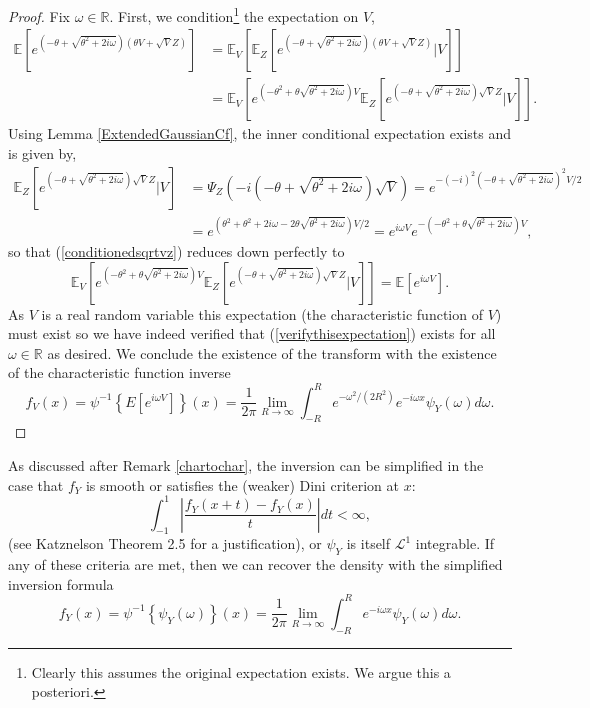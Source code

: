 \documentclass{article}
\begin{document}
\begin{proof}
Fix $\omega\in\mathbb{R}$. First, we condition\footnote{Clearly this assumes the original expectation exists. We argue this a posteriori.} the expectation on $V$,
\begin{align}
    \mathbb{E}\left[e^{\left(-\theta+\sqrt{\theta^2+2i\omega}\right)\left(\theta V+\sqrt{V}Z\right)}\right] &= \mathbb{E}_V\left[\mathbb{E}_Z\left[e^{\left(-\theta+\sqrt{\theta^2+2i\omega}\right)\left(\theta V+\sqrt{V}Z\right)}\big\vert V\right]\right]\\
    &= \mathbb{E}_V\left[e^{\left(-\theta^2+\theta\sqrt{\theta^2+2i\omega}\right)V}\mathbb{E}_Z\left[e^{ \left(-\theta+\sqrt{\theta^2+2i\omega}\right) \sqrt{V}Z}\big\vert V\right]\right]\label{conditionedsqrtvz}.
\end{align}
Using Lemma \ref{ExtendedGaussianCf}, the inner conditional expectation exists and is given by,
\begin{align}
    \mathbb{E}_Z\left[e^{ \left(-\theta+\sqrt{\theta^2+2i\omega}\right) \sqrt{V}Z}\big\vert V\right] &= \Psi_Z\left(-i\left(-\theta+\sqrt{\theta^2+2i\omega}\right)\sqrt{V}\right)= e^{-(-i)^2\left(-\theta+\sqrt{\theta^2+2i\omega}\right)^2V/2}\\
    &= e^{\left(\theta^2 + \theta^2+2i\omega-2\theta\sqrt{\theta^2+2i\omega}\right)V/2} = e^{i\omega V} e^{-\left(-\theta^2+\theta\sqrt{\theta^2+2i\omega}\right)V},
\end{align}
so that (\ref{conditionedsqrtvz}) reduces down perfectly to
\begin{equation}
    \mathbb{E}_V\left[e^{\left(-\theta^2+\theta\sqrt{\theta^2+2i\omega}\right)V}\mathbb{E}_Z\left[e^{\left(-\theta+\sqrt{\theta^2+2i\omega}\right)\sqrt{V}Z}\big\vert V\right]\right] = \mathbb{E}\left[e^{i\omega V}\right].
\end{equation}
As $V$ is a real random variable this expectation (the characteristic function of $V$) must exist so we have indeed verified that (\ref{verifythisexpectation}) exists for all $\omega\in\mathbb{R}$ as desired. We conclude the existence of the transform with the existence of the characteristic function inverse
\begin{equation}
    f_V(x) = \psi^{-1}\left\{E\left[e^{i\omega V}\right]\right\}(x) = \frac{1}{2\pi}\lim_{R\to\infty}\int_{-R}^{R}e^{-\omega^2/(2R^2)}e^{-i\omega x} \psi_Y(\omega)d\omega.
\end{equation}
\end{proof}
As discussed after Remark \ref{chartochar}, the inversion can be simplified in the case that $f_Y$ is smooth or satisfies the (weaker) Dini criterion at $x$:
\begin{equation}
    \int_{-1}^{1}\left\vert\dfrac{f_Y(x+t) - f_Y(x)}{t}\right\vert dt < \infty,
\end{equation}
(see Katznelson \cite{Katznelson} Theorem 2.5 for a justification), or $\psi_Y$ is itself $\mathcal{L}^1$ integrable. If any of these criteria are met, then we can recover the density with the simplified inversion formula
\begin{equation}
    f_Y(x) = \psi^{-1}\left\{\psi_Y(\omega)\right\}(x) = \frac{1}{2\pi}\lim_{R\to\infty}\int_{-R}^{R}e^{-i\omega x} \psi_Y(\omega)d\omega.
\end{equation}
\end{document}
